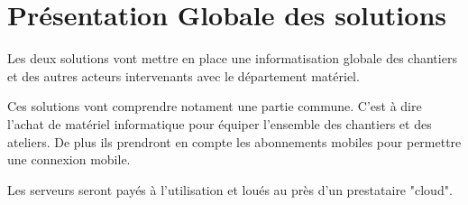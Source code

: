 \section{Présentation Globale des solutions}

Les deux solutions vont mettre en place une informatisation globale des 
chantiers et des autres acteurs intervenants avec le département matériel.

Ces solutions vont comprendre notament une partie commune. C'est à dire l'achat 
de matériel informatique pour équiper l'ensemble des chantiers et des ateliers.
De plus ils prendront en compte les abonnements mobiles pour permettre une connexion
mobile.

Les serveurs seront payés à l'utilisation et loués au près d'un prestataire "cloud".

